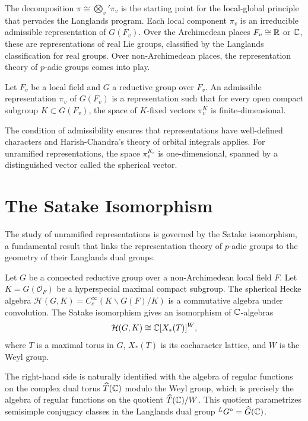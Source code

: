 The decomposition \(\pi \cong \bigotimes_v' \pi_v\) is the starting point for the local-global principle that pervades the Langlands program. Each local component \(\pi_v\) is an irreducible admissible representation of \(G(F_v)\). Over the Archimedean places \(F_v \cong \mathbb{R}\) or \(\mathbb{C}\), these are representations of real Lie groups, classified by the Langlands classification for real groups. Over non-Archimedean places, the representation theory of \(p\)-adic groups comes into play.

\begin{definition}
Let \(F_v\) be a local field and \(G\) a reductive group over \(F_v\). An admissible representation \(\pi_v\) of \(G(F_v)\) is a representation such that for every open compact subgroup \(K \subset G(F_v)\), the space of \(K\)-fixed vectors \(\pi_v^K\) is finite-dimensional.
\end{definition}

The condition of admissibility ensures that representations have well-defined characters and Harish-Chandra's theory of orbital integrals applies. For unramified representations, the space \(\pi_v^{K_v}\) is one-dimensional, spanned by a distinguished vector called the spherical vector.

\section{The Satake Isomorphism}

The study of unramified representations is governed by the Satake isomorphism, a fundamental result that links the representation theory of \(p\)-adic groups to the geometry of their Langlands dual groups.

\begin{theorem}
Let \(G\) be a connected reductive group over a non-Archimedean local field \(F\). Let \(K = G(\mathcal{O}_F)\) be a hyperspecial maximal compact subgroup. The spherical Hecke algebra \(\mathcal{H}(G,K) = C_c^\infty(K\backslash G(F)/K)\) is a commutative algebra under convolution. The Satake isomorphism gives an isomorphism of \(\mathbb{C}\)-algebras
\[
\mathcal{H}(G,K) \cong \mathbb{C}[X_*(T)]^{W},
\]
where \(T\) is a maximal torus in \(G\), \(X_*(T)\) is its cocharacter lattice, and \(W\) is the Weyl group.
\end{theorem}

The right-hand side is naturally identified with the algebra of regular functions on the complex dual torus \(\widehat{T}(\mathbb{C})\) modulo the Weyl group, which is precisely the algebra of regular functions on the quotient \(\widehat{T}(\mathbb{C})/W\). This quotient parametrizes semisimple conjugacy classes in the Langlands dual group \({}^L G^\circ = \widehat{G}(\mathbb{C})\).


